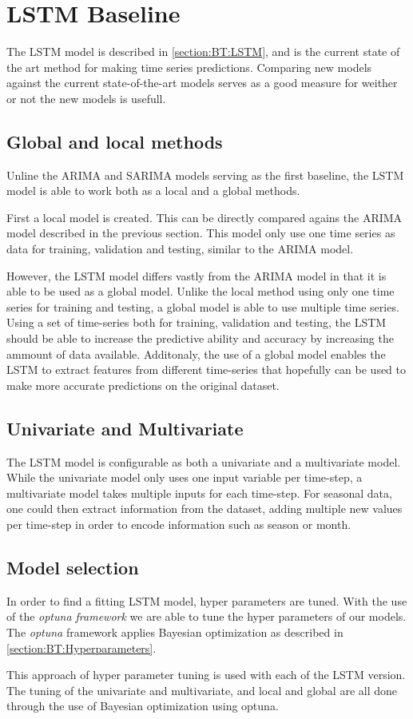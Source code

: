 
\section{LSTM Baseline}
\label{section:Architecture:Baselines:LSTM}

The LSTM model is described in \cref{section:BT:LSTM}, and is the current state of the art method for making time series predictions.
Comparing new models against the current state-of-the-art models serves as a good measure for weither or not the new models is usefull.

\subsection{Global and local methods}
Unline the ARIMA and SARIMA models serving as the first baseline,
the LSTM model is able to work both as a local and a global methods.

First a local model is created. This can be directly compared agains the ARIMA model described in the previous section.
This model only use one time series as data for training, validation and testing, similar to the ARIMA model.

However, the LSTM model differs vastly from the ARIMA model in that it is able to be used as a global model.
Unlike the local method using only one time series for training and testing,
a global model is able to use multiple time series.
Using a set of time-series both for training, validation and testing,
the LSTM should be able to increase the predictive ability and accuracy by increasing the ammount of data available.
Additonaly, the use of a global model enables the LSTM to extract features from different time-series that hopefully can be used to make more accurate predictions on the original dataset.

\subsection{Univariate and Multivariate}
The LSTM model is configurable as both a univariate and a multivariate model.
While the univariate model only uses one input variable per time-step, a multivariate model takes multiple inputs for each time-step.
For seasonal data, one could then extract information from the dataset, adding multiple new values per time-step in order to encode information such as season or month.

\subsection{Model selection}
In order to find a fitting LSTM model, hyper parameters are tuned.
With the use of the \textit{optuna framework} %
we are able to tune the hyper parameters of our models.
The \textit{optuna} framework applies Bayesian optimization as described in \cref{section:BT:Hyperparameters}.

This approach of hyper parameter tuning is used with each of the LSTM version.
The tuning of the univariate and multivariate, and local and global are all done through the use of Bayesian optimization using optuna.


